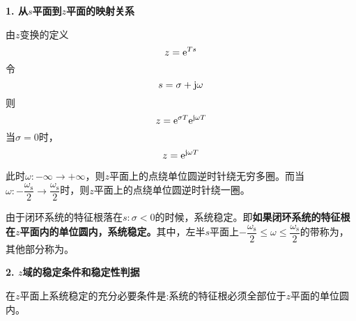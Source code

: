 \noindent \textbf{1. 从$s$平面到$z$平面的映射关系}

由$z$变换的定义
\begin{equation}
	z={\rm{e}}^{Ts}
\end{equation}
令
\begin{equation}
	s = \sigma + \text{j} \omega
\end{equation}
则
\begin{equation}
	z={\rm{e}}^{\sigma T}{\rm{e}}^{\text{j} \omega T}
\end{equation}
当$\sigma = 0$时，
\begin{equation}
	z = {\rm{e}}^{\text{j} \omega T}
\end{equation}

此时$\omega: -\infty \to +\infty$，则$z$平面上的点绕单位圆逆时针绕无穷多圈。而当$\omega : -\dfrac{\omega_{\text{s}}}{2} \to \dfrac{\omega_\text{s}}{2}$时，则$z$平面上的点绕单位圆逆时针绕一圈。

由于闭环系统的特征根落在$s: \sigma < 0$的时候，系统稳定。即\textbf{如果闭环系统的特征根在$z$平面内的单位圆内，系统稳定。}其中，左半$s$平面上$ -\dfrac{\omega_{\text{s}}}{2} \le \omega \le \dfrac{\omega_\text{s}}{2}$的带称为，其他部分称为。
\vspace*{1.5em}

\noindent \textbf{2. $z$域的稳定条件和稳定性判据}

在$z$平面上系统稳定的充分必要条件是:系统的特征根必须全部位于$z$平面的单位圆内。

